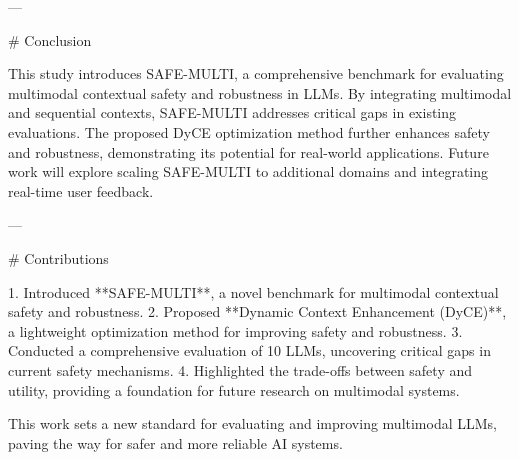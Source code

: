---

# Conclusion  

This study introduces SAFE-MULTI, a comprehensive benchmark for evaluating multimodal contextual safety and robustness in LLMs. By integrating multimodal and sequential contexts, SAFE-MULTI addresses critical gaps in existing evaluations. The proposed DyCE optimization method further enhances safety and robustness, demonstrating its potential for real-world applications. Future work will explore scaling SAFE-MULTI to additional domains and integrating real-time user feedback.

---

# Contributions  

1. Introduced **SAFE-MULTI**, a novel benchmark for multimodal contextual safety and robustness.  
2. Proposed **Dynamic Context Enhancement (DyCE)**, a lightweight optimization method for improving safety and robustness.  
3. Conducted a comprehensive evaluation of 10 LLMs, uncovering critical gaps in current safety mechanisms.  
4. Highlighted the trade-offs between safety and utility, providing a foundation for future research on multimodal systems.  

This work sets a new standard for evaluating and improving multimodal LLMs, paving the way for safer and more reliable AI systems.